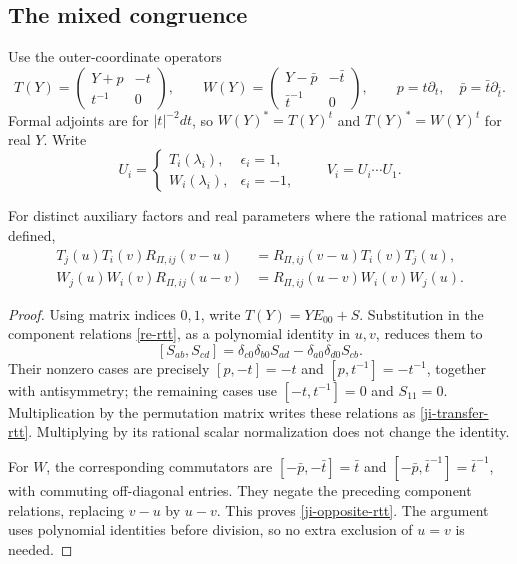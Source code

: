 \subsection{The mixed congruence}

Use the outer-coordinate operators
\[
 T(Y)=\begin{pmatrix}Y+p&-t\\t^{-1}&0\end{pmatrix},\qquad
 W(Y)=\begin{pmatrix}Y-\bar p&-\bar t\\\bar t^{-1}&0\end{pmatrix},
 \qquad p=t\partial_t,\quad\bar p=\bar t\partial_{\bar t}.
\]
Formal adjoints are for \(|t|^{-2}dt\), so
\(W(Y)^*=T(Y)^t\) and \(T(Y)^*=W(Y)^t\) for real \(Y\).
Write
\[
 U_i=
 \begin{cases}
 T_i(\lambda_i),&\epsilon_i=1,\\
 W_i(\lambda_i),&\epsilon_i=-1,
 \end{cases}
 \qquad V_i=U_i\cdots U_1.
\]


\begin{lemma}\label{ji-transfer-relations}
For distinct auxiliary factors and real parameters where the rational
matrices are defined,
\begin{align}
 T_j(u)T_i(v)R_{\Pi,ij}(v-u)
       &=R_{\Pi,ij}(v-u)T_i(v)T_j(u),\label{ji-transfer-rtt}\\
 W_j(u)W_i(v)R_{\Pi,ij}(u-v)
       &=R_{\Pi,ij}(u-v)W_i(v)W_j(u).\label{ji-opposite-rtt}
\end{align}
\end{lemma}

\begin{proof}
Using matrix indices \(0,1\), write \(T(Y)=Y E_{00}+S\).
Substitution in the component
relations \eqref{re-rtt}, as a polynomial identity in \(u,v\),
reduces them to
\[
 [S_{ab},S_{cd}]=\delta_{c0}\delta_{b0}S_{ad}
                              -\delta_{a0}\delta_{d0}S_{cb}.
\]
Their nonzero cases are precisely
\([p,-t]=-t\) and \([p,t^{-1}]=-t^{-1}\), together with
antisymmetry; the remaining cases use \([-t,t^{-1}]=0\)
and \(S_{11}=0\).  Multiplication by the permutation matrix
writes these relations as \eqref{ji-transfer-rtt}.  Multiplying
by its rational scalar normalization does not change the identity.

For \(W\), the corresponding commutators are
\([-\bar p,-\bar t]=\bar t\) and
\([-\bar p,\bar t^{-1}]=\bar t^{-1}\), with commuting
off-diagonal entries.  They negate the preceding component
relations, replacing \(v-u\) by \(u-v\).  This proves
\eqref{ji-opposite-rtt}.  The argument uses polynomial identities
before division, so no extra exclusion of \(u=v\) is needed.
\end{proof}

